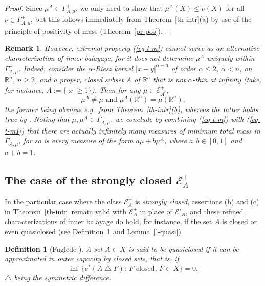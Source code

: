 \documentclass[12pt,a4paper,reqno]{amsart} %
\theoremstyle{lause}
\theoremstyle{maaritelma}
\theoremstyle{lause}
\theoremstyle{maaritelma}
\newtheorem{definition}[theorem]{Definition}
\newtheorem{remark}[theorem]{Remark}
\numberwithin{equation}{section}
\begin{document}
\begin{proof}
  Since $\mu^A\in\Gamma_{A,\mu}^+$, we only need to show that
  $\mu^A(X)\leqslant\nu(X)$  for all $\nu\in\Gamma_{A,\mu}^+$, but this follows immediately from Theorem~\ref{th-intr}(a) by use of
  the principle of positivity of mass (Theorem~\ref{pr-pos}).
\end{proof}

\begin{remark}\label{t-m-nonun} However, extremal property (\ref{eq-t-m}) cannot serve as an alternative characterization of inner balayage, for it does not determine $\mu^A$ uniquely within $\Gamma_{A,\mu}^+$. Indeed, consider the $\alpha$-Riesz kernel $|x-y|^{\alpha-n}$ of order $\alpha\leqslant2$, $\alpha<n$, on $\mathbb R^n$, $n\geqslant2$, and a proper, closed subset $A$ of $\mathbb R^n$ that is {\it not\/ $\alpha$-thin at infinity\/} \cite[Definition~3.1]{KM} (take, for instance, $A:=\{|x|\geqslant 1\}$). Then for any $\mu\in\mathcal E^+_{A^c}$,
\begin{equation}\label{eq-t-m1}\mu^A\ne\mu\text{ \ and \ }\mu^A(\mathbb R^n)=\mu(\mathbb R^n),\end{equation}
the former being obvious e.g.\ from Theorem~\ref{th-intr}(b), whereas the latter holds true by   \cite[Corollary~5.3]{Z-bal2}.
Noting that $\mu,\mu^A\in\Gamma_{A,\mu}^+$, we conclude by combining (\ref{eq-t-m}) with (\ref{eq-t-m1}) that there are actually infinitely many measures of minimum total mass in $\Gamma_{A,\mu}^+$, for so is every measure of the form $a\mu+b\mu^A$, where $a,b\in[0,1]$ and $a+b=1$.
\end{remark}

\subsection{The case of the strongly closed $\mathcal E^+_A$} In the particular case where the class $\mathcal E^+_A$ is {\it strongly closed}, assertions (b) and (c) in Theorem~\ref{th-intr} remain valid with $\mathcal E^+_A$ in place of $\mathcal E'_A$, and these refined characterizations of inner balayage do hold, for instance, if the set $A$ is closed or even quasiclosed (see Definition~\ref{def-quasi} and Lemma~\ref{l-quasi}).

\begin{definition}[{\rm Fuglede \cite{F71}}]\label{def-quasi}
A set $A\subset X$ is said to be {\it quasiclosed\/} if
it can be approximated in outer capacity by closed sets, that is, if
\begin{equation*}\label{def-q}
\inf\,\bigl\{c^*(A\bigtriangleup F):\ F\text{ closed, }F\subset X\bigr\}=0,
\end{equation*}
$\bigtriangleup$ being the symmetric difference.
\end{definition}
\end{document}
